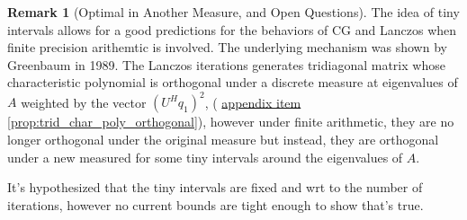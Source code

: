\documentclass[]{article}
\theoremstyle{definition}
\newtheorem{remark}{Remark}[subsection]  %
\begin{document}
        \begin{remark}[Optimal in Another Measure, and Open Questions]
            The idea of tiny intervals allows for a good predictions for the behaviors of CG and Lanczos when finite precision arithemtic is involved. The underlying mechanism was shown by Greenbaum in 1989\cite{paper:greenbaum1989}. The Lanczos iterations generates tridiagonal matrix whose characteristic polynomial is orthogonal under a discrete measure at eigenvalues of $A$ weighted by the vector $(U^Hq_1)^2$, ( \hyperref[prop:trid_char_poly_orthogonal]{appendix item \ref*{prop:trid_char_poly_orthogonal}}), however under finite arithmetic, they are no longer orthogonal under the original measure but instead, they are orthogonal under a new measured for some tiny intervals around the eigenvalues of $A$. 
            \par
            It's hypothesized that the tiny intervals are fixed and wrt to the number of iterations, however no current bounds are tight enough to show that's true. 
        \end{remark}
    
\end{document}
